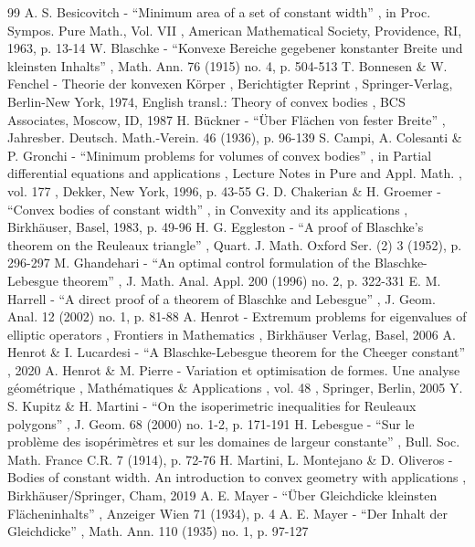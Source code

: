 \documentclass[11pt]{article}
\numberwithin{equation}{section}
\theoremstyle{plain}
\theoremstyle{definition}
\begin{document}
\begin{thebibliography}{99}
 A. S. Besicovitch - “Minimum area of a set of constant width” , in Proc. Sympos. Pure Math., Vol. VII , American Mathematical Society, Providence, RI, 1963, p. 13-14
 W. Blaschke - “Konvexe Bereiche gegebener konstanter Breite und kleinsten Inhalts” , Math. Ann. 76 (1915) no. 4, p. 504-513
 T. Bonnesen \& W. Fenchel - Theorie der konvexen Körper , Berichtigter Reprint , Springer-Verlag, Berlin-New York, 1974, English transl.: Theory of convex bodies , BCS Associates, Moscow, ID, 1987
 H. Bückner - “Über Flächen von fester Breite” , Jahresber. Deutsch. Math.-Verein. 46 (1936), p. 96-139
 S. Campi, A. Colesanti \& P. Gronchi - “Minimum problems for volumes of convex bodies” , in Partial differential equations and applications , Lecture Notes in Pure and Appl. Math. , vol. 177 , Dekker, New York, 1996, p. 43-55
 G. D. Chakerian \& H. Groemer - “Convex bodies of constant width” , in Convexity and its applications , Birkhäuser, Basel, 1983, p. 49-96
 H. G. Eggleston - “A proof of Blaschke’s theorem on the Reuleaux triangle” , Quart. J. Math. Oxford Ser. (2) 3 (1952), p. 296-297
 M. Ghandehari - “An optimal control formulation of the Blaschke-Lebesgue theorem” , J. Math. Anal. Appl. 200 (1996) no. 2, p. 322-331
 E. M. Harrell - “A direct proof of a theorem of Blaschke and Lebesgue” , J. Geom. Anal. 12 (2002) no. 1, p. 81-88
 A. Henrot - Extremum problems for eigenvalues of elliptic operators , Frontiers in Mathematics , Birkhäuser Verlag, Basel, 2006
 A. Henrot \& I. Lucardesi - “A Blaschke-Lebesgue theorem for the Cheeger constant” , 2020
 A. Henrot \& M. Pierre - Variation et optimisation de formes. Une analyse géométrique , Mathématiques \& Applications , vol. 48 , Springer, Berlin, 2005
 Y. S. Kupitz \& H. Martini - “On the isoperimetric inequalities for Reuleaux polygons” , J. Geom. 68 (2000) no. 1-2, p. 171-191
 H. Lebesgue - “Sur le problème des isopérimètres et sur les domaines de largeur constante” , Bull. Soc. Math. France C.R. 7 (1914), p. 72-76
 H. Martini, L. Montejano \& D. Oliveros - Bodies of constant width. An introduction to convex geometry with applications , Birkhäuser/Springer, Cham, 2019
 A. E. Mayer - “Über Gleichdicke kleinsten Flächeninhalts” , Anzeiger Wien 71 (1934), p. 4
 A. E. Mayer - “Der Inhalt der Gleichdicke” , Math. Ann. 110 (1935) no. 1, p. 97-127
\end{thebibliography}
\end{document}
